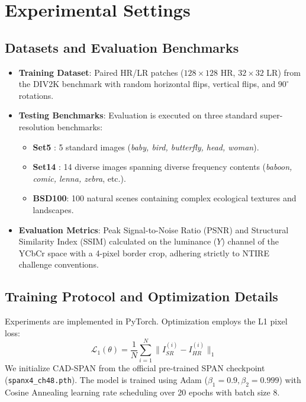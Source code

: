 \documentclass[conference]{IEEEtran}
\begin{document}
\section{Experimental Settings}

\subsection{Datasets and Evaluation Benchmarks}
\begin{itemize}
    \item \textbf{Training Dataset}: Paired HR/LR patches ($128 \times 128$ HR, $32 \times 32$ LR) from the DIV2K benchmark with random horizontal flips, vertical flips, and $90^\circ$ rotations.
    \item \textbf{Testing Benchmarks}: Evaluation is executed on three standard super-resolution benchmarks:
    \begin{itemize}
        \item \textbf{Set5} \cite{bevilacqua2012low}: 5 standard images (\textit{baby, bird, butterfly, head, woman}).
        \item \textbf{Set14} \cite{zeyde2010single}: 14 diverse images spanning diverse frequency contents (\textit{baboon, comic, lenna, zebra}, etc.).
        \item \textbf{BSD100}: 100 natural scenes containing complex ecological textures and landscapes.
    \end{itemize}
    \item \textbf{Evaluation Metrics}: Peak Signal-to-Noise Ratio (PSNR) and Structural Similarity Index (SSIM) calculated on the luminance ($Y$) channel of the YCbCr space with a 4-pixel border crop, adhering strictly to NTIRE challenge conventions.
\end{itemize}

\subsection{Training Protocol and Optimization Details}
Experiments are implemented in PyTorch. Optimization employs the L1 pixel loss:
\begin{equation}
\mathcal{L}_1(\theta) = \frac{1}{N}\sum_{i=1}^N \|I_{SR}^{(i)} - I_{HR}^{(i)}\|_1
\end{equation}
We initialize CAD-SPAN from the official pre-trained SPAN checkpoint (\texttt{spanx4\_ch48.pth}). The model is trained using Adam ($\beta_1=0.9, \beta_2=0.999$) with Cosine Annealing learning rate scheduling over 20 epochs with batch size 8.
\end{document}
